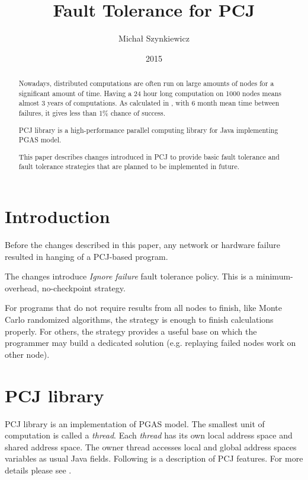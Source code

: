 \documentclass{llncs}
\begin{document}
\title{Fault Tolerance for PCJ}

\author{Michał Szynkiewicz}

\date{2015}
\maketitle

\begin{abstract}

Nowadays, distributed computations are often run on large amounts of nodes for a significant amount of time.
Having a 24 hour long computation on 1000 nodes means almost 3 years of computations.
As calculated in \cite{rx10}, with 6 month mean time between failures, it gives less than 1\% chance of success.

PCJ library is a high-performance parallel computing library for Java implementing PGAS model.

This paper describes changes introduced in PCJ to provide basic fault tolerance and fault tolerance strategies that are planned to be implemented in future.

\end{abstract}

\section{Introduction}
Before the changes described in this paper, any network or hardware failure resulted in hanging of a PCJ-based program.

The changes introduce \emph{Ignore failure} fault tolerance policy.
This is a minimum-overhead, no-checkpoint strategy.

For programs that do not require results from all nodes to finish, like Monte Carlo randomized algorithms, the strategy is enough to finish calculations properly.
For others, the strategy provides a useful base on which the programmer may build a dedicated solution (e.g. replaying failed nodes work on other node).



\section{PCJ library}
PCJ library is an implementation of PGAS model.
The smallest unit of computation is called a \emph{thread}. Each \emph{thread} has its own local address space and shared address space.
The owner thread accesses local and global address spaces variables as usual Java fields.
Following is a description of PCJ features. For more details please see \cite{pcj-manual}.
\end{document}
